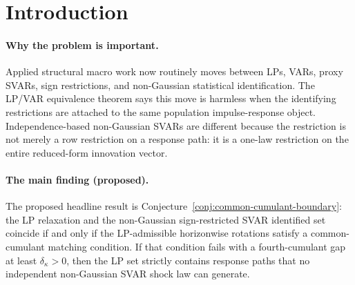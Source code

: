 \documentclass[11pt]{article}
\theoremstyle{definition}
\theoremstyle{plain}
\theoremstyle{remark}
\begin{document}
\begin{abstract}
Plagborg-Moller and Wolf show that local projections and VARs estimate the same population impulse responses when they target the same reduced-form object and use the same structural restrictions.  Non-Gaussian SVAR identification changes the object: the admissible impact matrix must diagonalize one shared innovation-law cumulant tensor, whereas horizonwise LP restrictions can be read as separate projection restrictions unless a common-shock completion is imposed.  This proposal asks for the sharp algebraic boundary between those two identified sets under bounded fourth-cumulant gaps and partial sign/zero restrictions.  The routine theorem is the Gaussian and common-cumulant-matching reduction back to the Plagborg-Moller--Wolf equivalence set.  The flagship conjecture is that strict LP/SVAR non-equivalence holds on an open set exactly when the horizonwise LP rotations cannot be pasted into one orthogonal rotation that diagonalizes the same fourth-cumulant tensor.  Resolving it would tell applied macroeconomists when a non-Gaussian or independence-refined sign-restricted SVAR is not just an LP implementation choice, but a strictly sharper structural object.
\end{abstract}

\section{Introduction}
\paragraph{Why the problem is important.}
Applied structural macro work now routinely moves between LPs, VARs, proxy SVARs, sign restrictions, and non-Gaussian statistical identification.  The LP/VAR equivalence theorem says this move is harmless when the identifying restrictions are attached to the same population impulse-response object.  Independence-based non-Gaussian SVARs are different because the restriction is not merely a row restriction on a response path: it is a one-law restriction on the entire reduced-form innovation vector.

\paragraph{The main finding (proposed).}
The proposed headline result is Conjecture~\ref{conj:common-cumulant-boundary}: the LP relaxation and the non-Gaussian sign-restricted SVAR identified set coincide if and only if the LP-admissible horizonwise rotations satisfy a common-cumulant matching condition.  If that condition fails with a fourth-cumulant gap at least \(\delta_\kappa>0\), then the LP set strictly contains response paths that no independent non-Gaussian SVAR shock law can generate.
\end{document}
